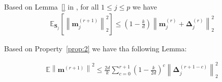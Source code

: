


\begin{property}\label{prop:2}
Based on Lemma~\ref{} in \cite{ivkin2019communication}, for all $1\leq j\leq p$ we have
\begin{align}
    \mathbb{E}_{\mathbf{S}_j}\left[\left\|\mathbf{m}_j^{(r+1)}\right\|^2_2\right]\leq\left(1-\frac{k}{d}\right)\left\|\mathbf{m}_j^{(r)}+\mathbf{\Delta}_j^{(r)}\right\|_2^2\label{eq:sketch_var}
\end{align}
\end{property}
Based on Property~\ref{prop:2} we have tha following Lemma:
\begin{lemma}\label{lmm:bndng-m}
\begin{align}
        \mathbb{E}\left\|\mathbf{m}^{(r+1)}\right\|^2\leq\frac{2d}{k}\sum_{c=0}^{r+1}\left(1-\frac{k}{2d}\right)^{c}\left\|\mathbf{\Delta}_j^{(r+1-c)}\right\|_2^2
\end{align}
\end{lemma}
